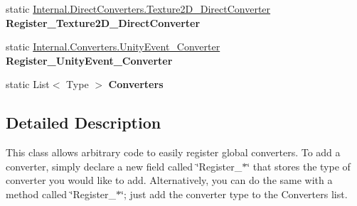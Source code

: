 \begin{DoxyCompactItemize}
static \hyperlink{class_full_serializer_1_1_internal_1_1_direct_converters_1_1_texture2_d___direct_converter}{Internal.\+Direct\+Converters.\+Texture2\+D\+\_\+\+Direct\+Converter} {\bfseries Register\+\_\+\+Texture2\+D\+\_\+\+Direct\+Converter}
\item 
\mbox{\label{class_full_serializer_1_1fs_converter_registrar_a9be90a403c0a8f2453ce3b8970c9bea6}} 
static \hyperlink{class_full_serializer_1_1_internal_1_1_converters_1_1_unity_event___converter}{Internal.\+Converters.\+Unity\+Event\+\_\+\+Converter} {\bfseries Register\+\_\+\+Unity\+Event\+\_\+\+Converter}
\item 
\mbox{\label{class_full_serializer_1_1fs_converter_registrar_abe9027e3fcd222955b36d41e409fd6f0}} 
static List$<$ Type $>$ {\bfseries Converters}
\end{DoxyCompactItemize}


\subsection{Detailed Description}
This class allows arbitrary code to easily register global converters. To add a converter, simply declare a new field called \char`\"{}\+Register\+\_\+$\ast$\char`\"{} that stores the type of converter you would like to add. Alternatively, you can do the same with a method called \char`\"{}\+Register\+\_\+$\ast$\char`\"{}; just add the converter type to the {\ttfamily Converters} list. 



